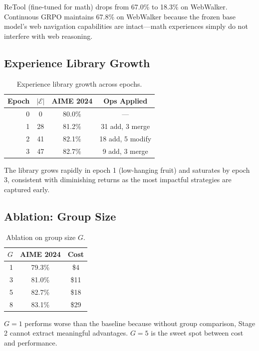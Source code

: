 \documentclass[11pt,letterpaper]{article}
\begin{document}
ReTool (fine-tuned for math) drops from 67.0\% to 18.3\% on WebWalker.  Continuous GRPO maintains 67.8\% on WebWalker because the frozen base model's web navigation capabilities are intact---math experiences simply do not interfere with web reasoning.

\subsection{Experience Library Growth}

\begin{table}[t]
\centering
\begin{tabular}{rccc}
\toprule
\textbf{Epoch} & \textbf{$|\mathcal{E}|$} & \textbf{AIME 2024} & \textbf{Ops Applied} \\
\midrule
0 & 0 & 80.0\% & --- \\
1 & 28 & 81.2\% & 31 add, 3 merge \\
2 & 41 & 82.1\% & 18 add, 5 modify \\
3 & 47 & 82.7\% & 9 add, 3 merge \\
\bottomrule
\end{tabular}
\caption{Experience library growth across epochs.}
\label{tab:growth}
\end{table}

The library grows rapidly in epoch 1 (low-hanging fruit) and saturates by epoch 3, consistent with diminishing returns as the most impactful strategies are captured early.

\subsection{Ablation: Group Size}

\begin{table}[t]
\centering
\begin{tabular}{rcc}
\toprule
\textbf{$G$} & \textbf{AIME 2024} & \textbf{Cost} \\
\midrule
1 & 79.3\% & \$4 \\
3 & 81.0\% & \$11 \\
5 & 82.7\% & \$18 \\
8 & 83.1\% & \$29 \\
\bottomrule
\end{tabular}
\caption{Ablation on group size $G$.}
\label{tab:ablation-g}
\end{table}

$G = 1$ performs worse than the baseline because without group comparison, Stage 2 cannot extract meaningful advantages.  $G = 5$ is the sweet spot between cost and performance.
\end{document}
